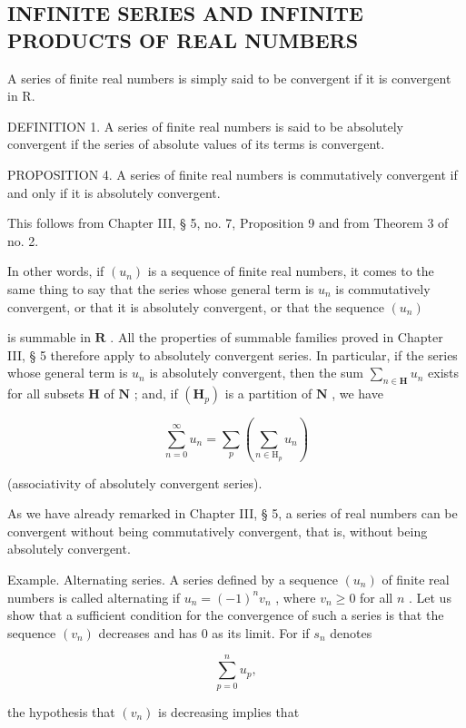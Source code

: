 \subsection{INFINITE SERIES AND INFINITE PRODUCTS OF REAL NUMBERS}

A series of finite real numbers is simply said to be convergent if it is convergent in R.

DEFINITION 1. A series of finite real numbers is said to be absolutely convergent if the series of absolute values of its terms is convergent.

PROPOSITION 4. A series of finite real numbers is commutatively convergent if and only if it is absolutely convergent.

This follows from Chapter III, § 5, no. 7, Proposition 9 and from Theorem 3 of no. 2.

In other words, if \((u_{n})\) is a sequence of finite real numbers, it comes to the same thing to say that the series whose general term is \(u_{n}\) is commutatively convergent, or that it is absolutely convergent, or that the sequence \((u_{n})\)

is summable in \(\mathbf{R}\) . All the properties of summable families proved in Chapter III, § 5 therefore apply to absolutely convergent series. In particular, if the series whose general term is \(u_{n}\) is absolutely convergent, then the sum \(\sum_{n\in\mathbf{H}} u_{n}\) exists for all subsets \(\mathbf{H}\) of \(\mathbf{N}\) ; and, if \((\mathbf{H}_{p})\) is a partition of \(\mathbf{N}\) , we have

\[
\sum_ {n = 0} ^ {\infty} u _ {n} = \sum_ {p} \left(\sum_ {n \in \mathrm{H} _ {p}} u _ {n}\right)
\]

(associativity of absolutely convergent series).

As we have already remarked in Chapter III, § 5, a series of real numbers can be convergent without being commutatively convergent, that is, without being absolutely convergent.

Example. Alternating series. A series defined by a sequence \((u_n)\) of finite real numbers is called alternating if \(u_n = (-1)^n v_n\) , where \(v_n \geqslant 0\) for all \(n\) . Let us show that a sufficient condition for the convergence of such a series is that the sequence \((v_n)\) decreases and has \(0\) as its limit. For if \(s_n\) denotes

\[
\sum_ {p = 0} ^ {n} u _ {p},
\]

the hypothesis that \((v_{n})\) is decreasing implies that

